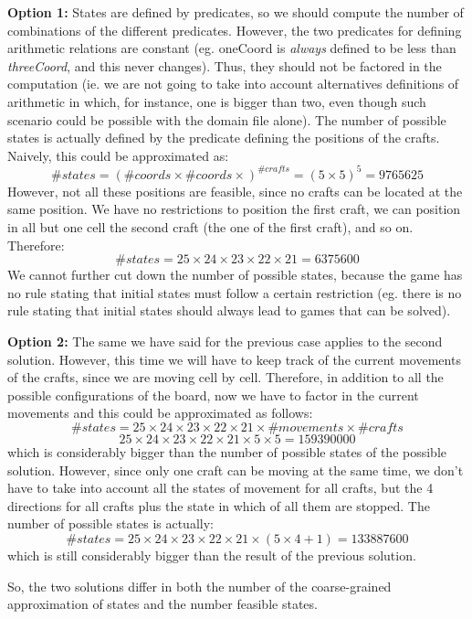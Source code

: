 \documentclass{article}
\begin{document}
\begin{enumerate}
\textbf{Option 1:} States are defined by predicates, so we should compute the number of combinations of the different predicates. However, the two predicates for defining arithmetic relations are constant (eg. oneCoord is \textit{always} defined to be less than \textit{threeCoord}, and this never changes). Thus, they should not be factored in the computation (ie. we are not going to take into account alternatives definitions of arithmetic in which, for instance, one is bigger than two, even though such scenario could be possible with the domain file alone). The number of possible states is actually defined by the predicate defining the positions of the crafts. Naively, this could be approximated as:
\[
\# states = (\# coords \times \# coords \times) ^ {\# crafts} = (5 \times 5)^{5} = 9765625
\]
However, not all these positions are feasible, since no crafts can be located at the same position. We have no restrictions to position the first craft, we can position in all but one cell the second craft (the one of the first craft), and so on. Therefore:
\[
\# states = 25 \times 24 \times 23 \times 22 \times 21 = 6375600
\]
We cannot further cut down the number of possible states, because the game has no rule stating that initial states must follow a certain restriction (eg. there is no rule stating that initial states should always lead to games that can be solved).

\textbf{Option 2:} The same we have said for the previous case applies to the second solution. However, this time we will have to keep track of the current movements of the crafts, since we are moving cell by cell. Therefore, in addition to all the possible configurations of the board, now we have to factor in the current movements and this could be approximated as follows:
\[
\# states = 25 \times 24 \times 23 \times 22 \times 21 \times \# movements \times \# crafts 
\]
\[
25 \times 24 \times 23 \times 22 \times 21 \times  5 \times 5 = 159390000
\]
which is considerably bigger than the number of possible states of the possible solution. However, since only one craft can be moving at the same time, we don't have to take into account all the states of movement for all crafts, but the 4 directions for all crafts plus the state in which of all them are stopped. The number of possible states is actually:
\[
\# states = 
25 \times 24 \times 23 \times 22 \times 21 \times ( 5 \times 4 + 1) = 133887600
\]
which is still considerably bigger than the result of the previous solution.

So, the two solutions differ in both the number of the coarse-grained approximation of states and the number feasible states.


\end{enumerate}
\end{document}
